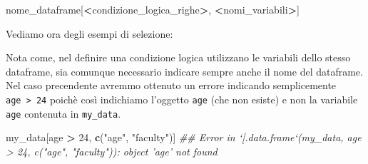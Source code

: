 \documentclass[
]{book}
\newenvironment{Shaded}{\begin{snugshade}}{\end{snugshade}}
\newcommand{\CommentTok}[1]{\textcolor[rgb]{0.56,0.35,0.01}{\textit{#1}}}
\newcommand{\DecValTok}[1]{\textcolor[rgb]{0.00,0.00,0.81}{#1}}
\newcommand{\KeywordTok}[1]{\textcolor[rgb]{0.13,0.29,0.53}{\textbf{#1}}}
\newcommand{\NormalTok}[1]{#1}
\newcommand{\OperatorTok}[1]{\textcolor[rgb]{0.81,0.36,0.00}{\textbf{#1}}}
\newcommand{\StringTok}[1]{\textcolor[rgb]{0.31,0.60,0.02}{#1}}
\begin{document}
\begin{Shaded}
\begin{Highlighting}[]
\NormalTok{nome_dataframe[}\OperatorTok{<}\NormalTok{condizione_logica_righe}\OperatorTok{>}\NormalTok{, }\OperatorTok{<}\NormalTok{nomi_variabili}\OperatorTok{>}\NormalTok{]}
\end{Highlighting}
\end{Shaded}

Vediamo ora degli esempi di selezione:

\begin{Shaded}
\end{Shaded}

Nota come, nel definire una condizione logica utilizzano le variabili dello stesso dataframe, sia comunque necessario indicare sempre anche il nome del dataframe. Nel caso precendente avremmo ottenuto un errore indicando semplicemente \texttt{age\ \textgreater{}\ 24} poichè così indichiamo l'oggetto \texttt{age} (che non esiste) e non la variabile \texttt{age} contenuta in \texttt{my\_data}.

\begin{Shaded}
\begin{Highlighting}[]
\NormalTok{my_data[age }\OperatorTok{>}\StringTok{ }\DecValTok{24}\NormalTok{, }\KeywordTok{c}\NormalTok{(}\StringTok{"age"}\NormalTok{, }\StringTok{"faculty"}\NormalTok{)]}
\CommentTok{## Error in `[.data.frame`(my_data, age > 24, c("age", "faculty")): object 'age' not found}
\end{Highlighting}
\end{Shaded}
\end{document}
